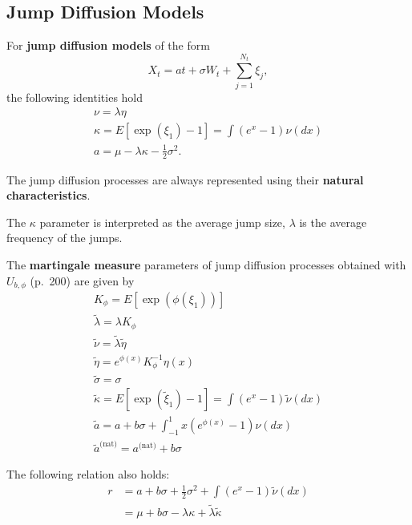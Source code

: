 \subsection{Jump Diffusion Models}
\begin{outline}
  \1 For \textbf{jump diffusion models} of the form
  \begin{equation*}
    X_t = at + \sigma W_t + \sum_{j=1}^{N_t}\xi_j,
  \end{equation*}
  the following identities hold
  \begin{gather*}
    \nu = \lambda\eta\\
    \kappa = E[\exp(\xi_1)-1] = \int(e^x-1)\nu(dx)\\
    a = \mu -\lambda\kappa -\tfrac{1}{2}\sigma^2.
  \end{gather*}

  \1 The jump diffusion processes are always represented using their \textbf{natural
    characteristics}.

  \1 The $\kappa$ parameter is interpreted as the average jump size, $\lambda$ is the
  average frequency of the jumps.

  \1 The \textbf{martingale measure} parameters of jump diffusion processes obtained with
  $U_{b,\phi}$ (p.~200) are given by
  \begin{gather*}
    K_\phi = E[\exp(\phi(\xi_1))]\\
    \tilde\lambda = \lambda K_\phi\\
    \tilde\nu = \tilde\lambda\tilde\eta\\
    \tilde\eta = e^{\phi(x)}K_\phi^{-1}\eta(x)\\
    \tilde\sigma = \sigma\\
    \tilde\kappa = E[\exp(\tilde\xi_1)-1] = \int(e^x-1)\tilde\nu(dx)\\
    \tilde a = a + b\sigma +\int_{-1}^1x(e^{\phi(x)}-1)\nu(dx)\\
    \tilde a^{\text{(nat)}} = a^{\text{(nat)}} + b\sigma
  \end{gather*}

  \1 The following relation also holds:
  \begin{align*}
    r &= a + b\sigma + \tfrac{1}{2}\sigma^2 + \int(e^x-1)\tilde\nu(dx)\\
      &= \mu + b\sigma - \lambda\kappa + \tilde\lambda\tilde\kappa
  \end{align*}
\end{outline}

